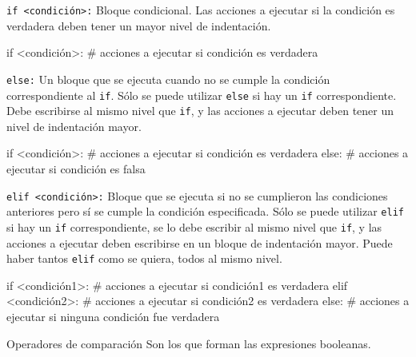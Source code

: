 \newpage
\begin{referencia_python}

\begin{sintaxis}{\lstinline!if <condición>:!}
Bloque condicional.  Las acciones a ejecutar si la condición
es verdadera deben tener un mayor nivel de indentación.
\begin{codigo-python-sn}
if <condición>:
    # acciones a ejecutar si condición es verdadera
\end{codigo-python-sn}
\end{sintaxis}

\begin{sintaxis}{\lstinline!else:!}
Un bloque que se ejecuta cuando no se cumple la condición
correspondiente al \lstinline!if!.  Sólo se puede utilizar 
\lstinline!else! si hay un \lstinline!if! correspondiente.  Debe
escribirse al mismo nivel que \lstinline!if!, y las acciones a ejecutar
deben tener un nivel de indentación mayor.
\begin{codigo-python-sn}
if <condición>:
    # acciones a ejecutar si condición es verdadera
else:
    # acciones a ejecutar si condición es falsa
\end{codigo-python-sn}
\end{sintaxis}

\begin{sintaxis}{\lstinline!elif <condición>:!}
Bloque que se ejecuta si no se cumplieron las condiciones
anteriores pero sí se cumple la condición especificada.  Sólo se puede utilizar
\lstinline!elif! si hay un \lstinline!if! correspondiente, se lo debe
escribir al mismo nivel que \lstinline!if!, y las acciones a ejecutar deben
escribirse en un bloque de indentación mayor.  Puede haber tantos
\lstinline!elif! como se quiera, todos al mismo nivel.
\begin{codigo-python-sn}
if <condición1>:
    # acciones a ejecutar si condición1 es verdadera
elif <condición2>:
	# acciones a ejecutar si condición2 es verdadera
else:
    # acciones a ejecutar si ninguna condición fue verdadera
\end{codigo-python-sn}
\end{sintaxis}

\begin{sintaxis}{Operadores de comparación}
Son los que forman las expresiones booleanas.


\end{sintaxis}
\end{referencia_python}

